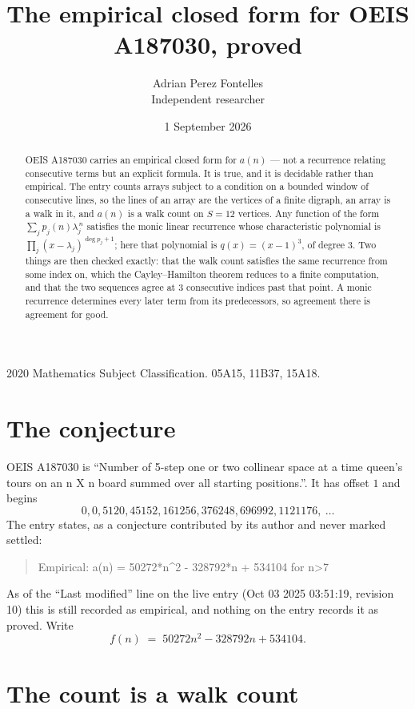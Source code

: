 \documentclass[11pt,a4paper]{article}
\title{The empirical closed form for OEIS A187030, proved}
\author{Adrian Perez Fontelles\\ \small Independent researcher}
\date{1 September 2026}
\theoremstyle{plain}
\theoremstyle{definition}
\begin{document}
\maketitle

\begin{abstract}
OEIS A187030 carries an empirical closed form for $a(n)$ --- not a recurrence relating
consecutive terms but an explicit formula. It is true, and it is decidable rather than
empirical. The entry counts arrays subject to a condition on a bounded window of consecutive lines, so the lines of an array are the
vertices of a finite digraph, an array is a walk in it, and $a(n)$ is a walk count on
$S=12$ vertices. Any function of the form $\sum_j p_j(n)\lambda_j^{\,n}$ satisfies the
monic linear recurrence whose characteristic polynomial is
$\prod_j(x-\lambda_j)^{\deg p_j+1}$; here that polynomial is $q(x)=(x-1)^{3}$, of degree
$3$. Two things are then checked exactly: that the walk count satisfies the same
recurrence from some index on, which the Cayley--Hamilton theorem reduces to a finite
computation, and that the two sequences agree at $3$ consecutive indices past that
point. A monic recurrence determines every later term from its predecessors, so agreement
there is agreement for good.
\end{abstract}

\noindent\small 2020 Mathematics Subject Classification. 05A15, 11B37, 15A18.\normalsize

\section{The conjecture}

OEIS A187030 is ``Number of 5-step one or two collinear space at a time queen's tours on an n X n board summed over all starting positions.''. It has offset $1$ and begins
\[
0, 0, 5120, 45152, 161256, 376248, 696992, 1121176,\ \dots
\]
The entry states, as a conjecture contributed by its author and never marked settled:
\begin{quote}
Empirical: a(n) = 50272*n\^{}2 - 328792*n + 534104 for n>7
\end{quote}
As of the ``Last modified'' line on the live entry (Oct 03 2025 03:51:19, revision 10) this is still
recorded as empirical, and nothing on the entry records it as proved. Write
\[
f(n)\;=\;50272 n^{2} - 328792 n + 534104.
\]

\section{The count is a walk count}
\end{document}
